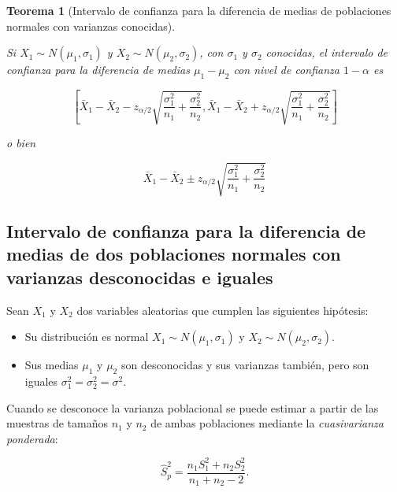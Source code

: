 \documentclass[
  a4paper,
]{scrreport}
\providecommand{\tightlist}{%
  \setlength{\itemsep}{0pt}\setlength{\parskip}{0pt}}\usepackage{longtable,booktabs,array}
\theoremstyle{definition}
\theoremstyle{definition}
\theoremstyle{plain}
\newtheorem{theorem}{Teorema}[chapter]
\theoremstyle{remark}
\begin{document}
\begin{theorem}[Intervalo de confianza para la diferencia de medias de
poblaciones normales con varianzas
conocidas]\protect\hypertarget{thm-intervalo-confianza-diferencia-medias-normales-varianzas-conocidas}{}\label{thm-intervalo-confianza-diferencia-medias-normales-varianzas-conocidas}

Si \(X_1\sim N(\mu_1,\sigma_1)\) y \(X_2\sim N(\mu_2,\sigma_2)\), con
\(\sigma_1\) y \(\sigma_2\) conocidas, el \emph{intervalo de confianza
para la diferencia de medias} \(\mu_1-\mu_2\) con nivel de confianza
\(1-\alpha\) es

\[
\left[\bar{X}_1-\bar{X}_2-z_{\alpha/2}\sqrt{\frac{\sigma^2_1}{n_1}+\frac{\sigma^2_2}{n_2}},\bar{X}_1-\bar{X}_2+z_{\alpha/2}\sqrt{\frac{\sigma^2_1}{n_1}+\frac{\sigma^2_2}{n_2}}\right]
\]

o bien

\[
\bar{X}_1-\bar{X}_2\pm z_{\alpha/2}\sqrt{\frac{\sigma^2_1}{n_1}+\frac{\sigma^2_2}{n_2}}
\]

\end{theorem}

\hypertarget{intervalo-de-confianza-para-la-diferencia-de-medias-de-dos-poblaciones-normales-con-varianzas-desconocidas-e-iguales}{%
\subsection{Intervalo de confianza para la diferencia de medias de dos
poblaciones normales con varianzas desconocidas e
iguales}\label{intervalo-de-confianza-para-la-diferencia-de-medias-de-dos-poblaciones-normales-con-varianzas-desconocidas-e-iguales}}

Sean \(X_1\) y \(X_2\) dos variables aleatorias que cumplen las
siguientes hipótesis:

\begin{itemize}
\tightlist
\item
  Su distribución es normal \(X_1\sim N(\mu_1,\sigma_1)\) y
  \(X_2\sim N(\mu_2,\sigma_2)\).
\item
  Sus medias \(\mu_1\) y \(\mu_2\) son desconocidas y sus varianzas
  también, pero son iguales \(\sigma^2_1=\sigma^2_2=\sigma^2\).
\end{itemize}

Cuando se desconoce la varianza poblacional se puede estimar a partir de
las muestras de tamaños \(n_1\) y \(n_2\) de ambas poblaciones mediante
la \emph{cuasivarianza ponderada}:

\[
\hat{S}^2_p = \frac{n_1S^2_1+n_2S^2_2}{n_1+n_2-2}.
\]
\end{document}
